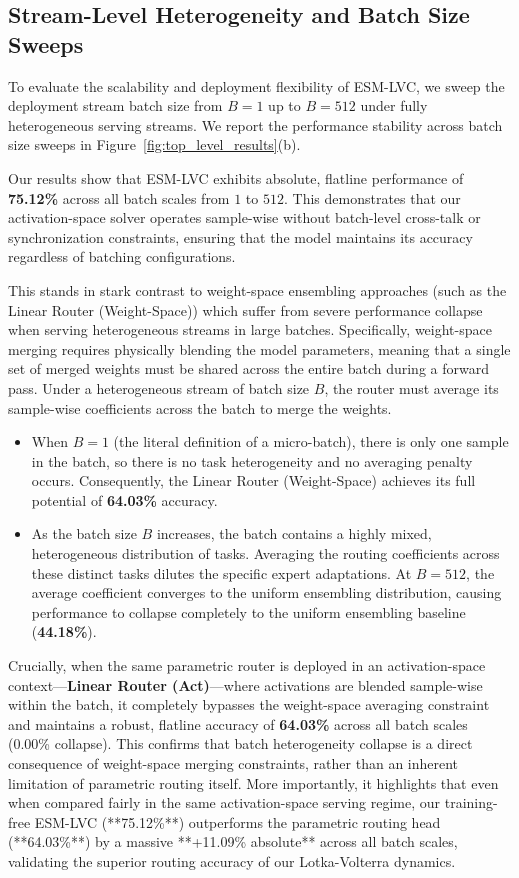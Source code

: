 \subsection{Stream-Level Heterogeneity and Batch Size Sweeps}
To evaluate the scalability and deployment flexibility of ESM-LVC, we sweep the deployment stream batch size from $B=1$ up to $B=512$ under fully heterogeneous serving streams. We report the performance stability across batch size sweeps in Figure~\ref{fig:top_level_results}(b).

Our results show that ESM-LVC exhibits absolute, flatline performance of \textbf{75.12\%} across all batch scales from $1$ to $512$. This demonstrates that our activation-space solver operates sample-wise without batch-level cross-talk or synchronization constraints, ensuring that the model maintains its accuracy regardless of batching configurations.

This stands in stark contrast to weight-space ensembling approaches (such as the Linear Router (Weight-Space)) which suffer from severe performance collapse when serving heterogeneous streams in large batches.
Specifically, weight-space merging requires physically blending the model parameters, meaning that a single set of merged weights must be shared across the entire batch during a forward pass. Under a heterogeneous stream of batch size $B$, the router must average its sample-wise coefficients across the batch to merge the weights.
\begin{itemize}
    \item When $B=1$ (the literal definition of a micro-batch), there is only one sample in the batch, so there is no task heterogeneity and no averaging penalty occurs. Consequently, the Linear Router (Weight-Space) achieves its full potential of \textbf{64.03\%} accuracy.
    \item As the batch size $B$ increases, the batch contains a highly mixed, heterogeneous distribution of tasks. Averaging the routing coefficients across these distinct tasks dilutes the specific expert adaptations. At $B=512$, the average coefficient converges to the uniform ensembling distribution, causing performance to collapse completely to the uniform ensembling baseline (\textbf{44.18\%}).
\end{itemize}
Crucially, when the same parametric router is deployed in an activation-space context—\textbf{Linear Router (Act)}—where activations are blended sample-wise within the batch, it completely bypasses the weight-space averaging constraint and maintains a robust, flatline accuracy of \textbf{64.03\%} across all batch scales (0.00\% collapse). This confirms that batch heterogeneity collapse is a direct consequence of weight-space merging constraints, rather than an inherent limitation of parametric routing itself. More importantly, it highlights that even when compared fairly in the same activation-space serving regime, our training-free ESM-LVC (**75.12\%**) outperforms the parametric routing head (**64.03\%**) by a massive **+11.09\% absolute** across all batch scales, validating the superior routing accuracy of our Lotka-Volterra dynamics.

